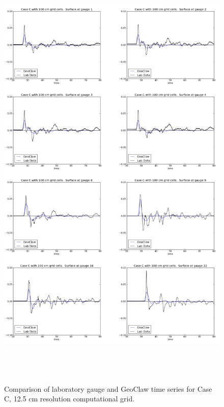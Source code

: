 \begin{figure}[ht]
\hfil\includegraphics[height=8.5in]{bp6/C100Gages.png}\hfil
\caption{\label{C100Gages}
Comparison of laboratory gauge and GeoClaw time series for Case C, 12.5 cm resolution computational grid.
  }
\end{figure}

